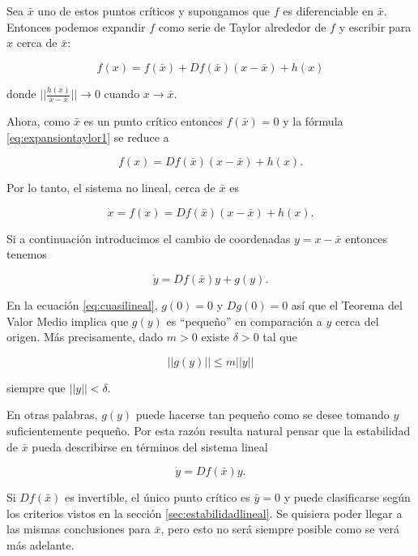 Sea $\bar{x}$ uno de estos puntos críticos y supongamos que $f$ es diferenciable en $\bar{x}$. Entonces podemos expandir $f$ como serie de Taylor alrededor de $f$ y escribir para $x$ cerca de $\bar{x}$:

\begin{equation} \label{eq:expansiontaylor1}
	f(x) = f(\bar{x}) + Df(\bar{x})(x - \bar{x}) + h(x)
\end{equation}

donde $|| \frac{h(x)}{x - \bar{x}}|| \to 0$ cuando $x \to \bar{x}$.

Ahora, como $\bar{x}$ es un punto crítico entonces $f(\bar{x}) = 0$ y la fórmula \ref{eq:expansiontaylor1} se reduce a 

\begin{equation}
	f(x) = Df(\bar{x})(x - \bar{x}) + h(x).
\end{equation}

Por lo tanto, el sistema no lineal, cerca de $\bar{x}$ es

$$ \dot{x} = f(x) = Df(\bar{x})(x - \bar{x}) + h(x).$$

Si a continuación introducimos el cambio de coordenadas $y = x - \bar{x}$ entonces tenemos 

\begin{equation} \label{eq:cuasilineal}
	\dot{y} = Df(\bar{x})y + g(y).
\end{equation}

En la ecuación \ref{eq:cuasilineal}, $g(0) = 0$ y $Dg(0) = 0$ así que el Teorema del Valor Medio implica que $g(y)$ es ``pequeño'' en comparación a $y$ cerca del origen. Más precisamente, dado $m > 0$ existe $\delta > 0$ tal que 

$$ ||g(y)|| \leq m||y||$$

siempre que $||y|| < \delta$.

En otras palabras, $g(y)$ puede hacerse tan pequeño como se desee tomando $y$ suficientemente pequeño. Por esta razón resulta natural pensar que la estabilidad de $\bar{x}$ pueda describirse en términos del sistema lineal

\begin{equation} \label{eq:linealizacion}
	\dot{y} = Df(\bar{x})y.
\end{equation}

Si $Df(\bar{x})$ es invertible, el único punto crítico es $\bar{y} = 0$ y puede clasificarse según los criterios vistos en la sección \ref{sec:estabilidadlineal}.
Se quisiera poder llegar a las mismas conclusiones para $\bar{x}$, pero esto no será siempre posible como se verá más adelante.

